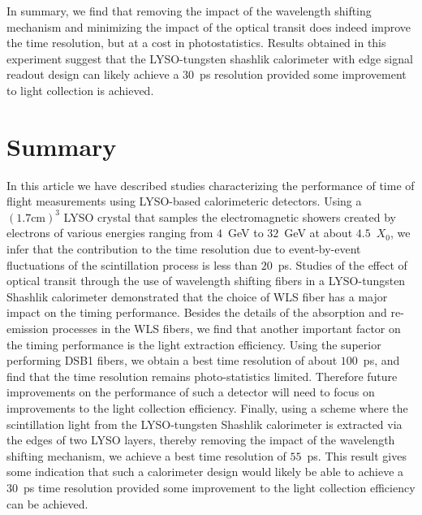 \documentclass[12pt]{article}
\begin{document}
In summary, we find that removing the impact of the wavelength shifting mechanism
and minimizing the impact of the optical transit does indeed improve the time
 resolution, but at a cost in photostatistics. Results obtained in this
experiment suggest that the LYSO-tungsten shashlik calorimeter with edge
signal readout design can likely achieve a $30$~ps resolution provided 
some improvement to light collection is achieved.

\section{Summary}

In this article we have described studies characterizing the 
performance of time of flight measurements using
LYSO-based calorimeteric detectors. Using a $(1.7\mathrm{ cm})^{3}$
LYSO crystal that samples the electromagnetic showers created
by electrons of various energies ranging from $4$~GeV to $32$~GeV
at about $4.5$~$X_{0}$, we infer that the contribution to the 
time  resolution due to event-by-event fluctuations 
of the scintillation process is less than $20$~ps. Studies of the
effect of optical transit through the use of wavelength shifting
fibers in a LYSO-tungsten Shashlik calorimeter demonstrated that
the choice of WLS fiber has a major impact on the timing performance.
Besides the details of the absorption and re-emission processes in
the WLS fibers, we find that another important factor on
the timing performance is the light extraction efficiency. Using
the superior performing DSB1 fibers, we obtain a best time
resolution of about $100$~ps, and find that the time
resolution remains photo-statistics limited.
Therefore future improvements on the performance of such a 
detector will need to focus on improvements to the light collection
efficiency. Finally, using a scheme where the scintillation
light from the LYSO-tungsten Shashlik calorimeter is extracted
via the edges of two LYSO layers, thereby removing the impact
of the wavelength shifting mechanism, we achieve a best time  resolution of $55$~ps. This result gives some indication that such a
calorimeter design would likely be able to achieve a $30$~ps 
time  resolution provided some improvement to the 
light collection efficiency can be achieved.
\end{document}
